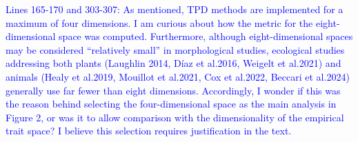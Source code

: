 \documentclass[
]{article}
\begin{document}

\textcolor{blue}{Lines 165-170 and 303-307: As mentioned, TPD methods are implemented for a maximum of four dimensions.
I am curious about how the metric for the eight-dimensional space was computed.
Furthermore, although eight-dimensional spaces may be considered ``relatively small'' in morphological studies, ecological studies addressing both plants (Laughlin 2014, Díaz et al.2016, Weigelt et al.2021) and animals (Healy et al.2019, Mouillot et al.2021, Cox et al.2022, Beccari et al.2024) generally use far fewer than eight dimensions.
Accordingly, I wonder if this was the reason behind selecting the four-dimensional space as the main analysis in Figure 2, or was it to allow comparison with the dimensionality of the empirical trait space? I believe this selection requires justification in the text.}

\end{document}
